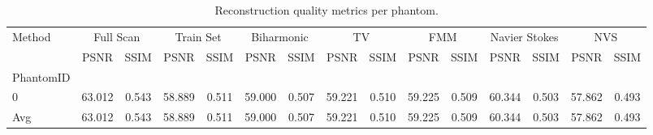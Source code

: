 \begin{table}
\caption{Reconstruction quality metrics per phantom.}
\label{tab:phantom_metrics}
\begin{tabular}{|l|cc|cc|cc|cc|cc|cc|cc|}
\toprule
Method & \multicolumn{2}{c}{Full Scan} & \multicolumn{2}{c}{Train Set} & \multicolumn{2}{c}{Biharmonic} & \multicolumn{2}{c}{TV} & \multicolumn{2}{c}{FMM} & \multicolumn{2}{c}{Navier Stokes} & \multicolumn{2}{c}{NVS} \\
 & PSNR & SSIM & PSNR & SSIM & PSNR & SSIM & PSNR & SSIM & PSNR & SSIM & PSNR & SSIM & PSNR & SSIM \\
PhantomID &  &  &  &  &  &  &  &  &  &  &  &  &  &  \\
\midrule
0 & 63.012 & 0.543 & 58.889 & 0.511 & 59.000 & 0.507 & 59.221 & 0.510 & 59.225 & 0.509 & 60.344 & 0.503 & 57.862 & 0.493 \\
Avg & 63.012 & 0.543 & 58.889 & 0.511 & 59.000 & 0.507 & 59.221 & 0.510 & 59.225 & 0.509 & 60.344 & 0.503 & 57.862 & 0.493 \\
\bottomrule
\end{tabular}
\end{table}
